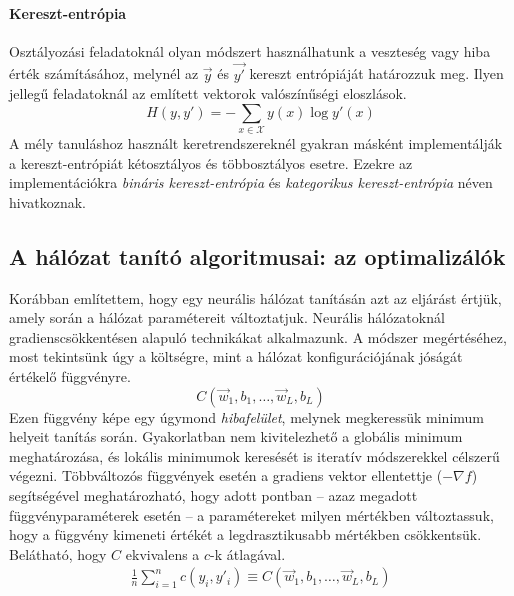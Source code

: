 \paragraph{Kereszt-entrópia}
Osztályozási feladatoknál olyan módszert használhatunk a veszteség  vagy hiba érték számításához, melynél az $\vec{y}$ és $\vec{y'}$  kereszt entrópiáját határozzuk meg. Ilyen jellegű feladatoknál az említett vektorok valószínűségi eloszlások.
\begin{displaymath}
	H(y,y')= -\sum_{x\in \mathcal{X}}y(x)\log y'(x)
\end{displaymath}
A mély tanuláshoz használt keretrendszereknél gyakran másként implementálják a kereszt-entrópiát kétosztályos és többosztályos esetre. Ezekre az implementációkra \emph{bináris kereszt-entrópia} és \emph{kategorikus kereszt-entrópia} néven hivatkoznak.

\subsection{A hálózat tanító algoritmusai: az optimalizálók}
Korábban említettem, hogy egy neurális hálózat tanításán azt az eljárást értjük, amely során a hálózat paramétereit változtatjuk. Neurális hálózatoknál gradienscsökkentésen alapuló technikákat alkalmazunk. %
A módszer megértéséhez, most tekintsünk úgy a költségre, mint a hálózat konfigurációjának jóságát értékelő függvényre.
$$ C(\vec{w}_1,b_1,\dots,\vec{w}_L,b_L) $$
Ezen függvény képe egy úgymond \emph{hibafelület}, melynek megkeressük  minimum helyeit tanítás során. Gyakorlatban nem kivitelezhető a globális minimum meghatározása, és lokális minimumok keresését is iteratív módszerekkel célszerű végezni. Többváltozós függvények esetén a gradiens vektor ellentettje ($-\nabla f$) segítségével meghatározható, hogy adott pontban -- azaz megadott függvényparaméterek esetén -- a paramétereket milyen mértékben változtassuk, hogy a függvény kimeneti értékét a legdrasztikusabb mértékben csökkentsük.
Belátható, hogy $C$ ekvivalens a $c$-k átlagával.
\begin{align*}
	\frac{1}{n}\sum_{i=1}^{n}c(y_i,y'_i) \equiv C(\vec{w}_1,b_1,\dots,\vec{w}_L,b_L)\\
\end{align*}

